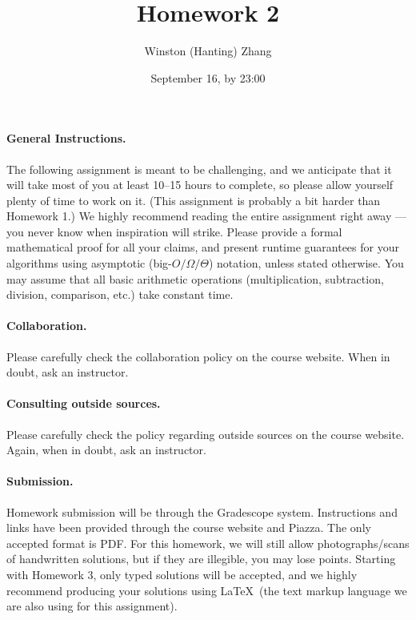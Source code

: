 \documentclass[10pt]{article}
\title{\bf Homework 2}
\author{Winston (Hanting) Zhang}
\date{September 16, by 23:00}
\begin{document}
\maketitle

\paragraph{General Instructions.} The following assignment is meant to be challenging, and we anticipate that it will take most of you at least 10--15 hours to complete, so please allow yourself plenty of time to work on it. (This assignment is probably a bit harder than Homework 1.)
We highly recommend reading the entire assignment right away --- you never know when inspiration will strike.
Please provide a formal mathematical proof for all your claims, and  present runtime guarantees for your algorithms using asymptotic (big-$O/\Omega/\Theta$) notation, unless stated otherwise. You may assume that all basic arithmetic operations (multiplication, subtraction, division, comparison, etc.) take constant time. %

\paragraph{Collaboration.}  Please carefully check the collaboration policy on the course website. When in doubt, ask an instructor.

\paragraph{Consulting outside sources.} Please carefully check the policy regarding outside sources on the course website. Again, when in doubt, ask an instructor.

\paragraph{Submission.} Homework submission will be through the Gradescope system. Instructions and links have been provided through the course website and Piazza. The only accepted format is PDF. For this homework, we will still allow photographs/scans of handwritten solutions, but if they are illegible, you may lose points. Starting with Homework 3, only typed solutions will be accepted, and we highly recommend producing your solutions using \LaTeX~(the text markup language we are also using for this assignment).
\end{document}

